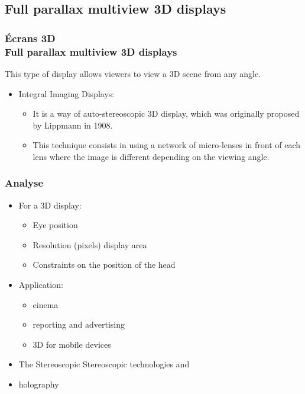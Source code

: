 \subsection{Full parallax multiview 3D displays} 
\begin{frame}
  \frametitle{Écrans 3D \\Full parallax multiview 3D displays} 
  
This type of display allows viewers to view a 3D scene from any angle.\\
  
  \begin{itemize}
  \item Integral Imaging Displays:
    
    \begin{itemize}
    \item It is a way of auto-stereoscopic 3D display, which was originally proposed by Lippmann in 1908.

    \item This technique consists in using a network of micro-lenses in front of each lens where the image is different depending on the viewing angle.

    \end{itemize}
  \end{itemize}
  
\end{frame}
\begin{frame}
  \frametitle{Analyse} 
  
  \begin{itemize}
  \item For a 3D display:
    \begin{itemize}
    \item Eye position
    \item Resolution (pixels) display area
    \item Constraints on the position of the head
    \end{itemize}
  \end{itemize}

  \begin{itemize}
  \item Application:
    \begin{itemize}
    \item cinema
    \item reporting and advertising
    \item 3D for mobile devices
    \end{itemize}
  \end{itemize}
  \begin{itemize}
  \item The Stereoscopic Stereoscopic technologies and
  \item holography
  \end{itemize}
\end{frame}


